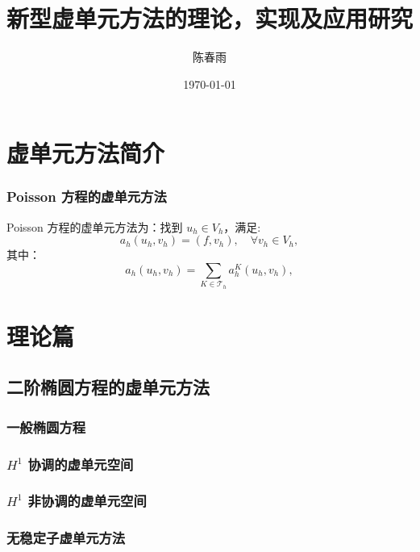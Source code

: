 \documentclass[aspectratio=169,serif]{beamer}
\begin{document}
\title{新型虚单元方法的理论，实现及应用研究}
\author{陈春雨}
 
\date
{
    \today
}



\frame[plain]{\titlepage}

\section{虚单元方法简介}
\begin{frame}
  \frametitle{Poisson 方程的虚单元方法}

  Poisson 方程的虚单元方法为：找到 $u_h \in V_h$，满足:
  $$
  a_h(u_h, v_h) = (f, v_h), \quad \forall v_h \in V_h,
  $$
  其中：
  $$
  a_h(u_h, v_h) = \sum_{K \in \mathcal{T}_h} a_h^K(u_h, v_h),
  $$


\end{frame}



\section{理论篇}
\subsection{二阶椭圆方程的虚单元方法}
\begin{frame}
  \frametitle{一般椭圆方程}
\end{frame}

\begin{frame}
  \frametitle{$H^1$ 协调的虚单元空间}
\end{frame}

\begin{frame}
  \frametitle{$H^1$ 非协调的虚单元空间}
\end{frame}

\begin{frame}
  \frametitle{无稳定子虚单元方法}
\end{frame}
\end{document}
